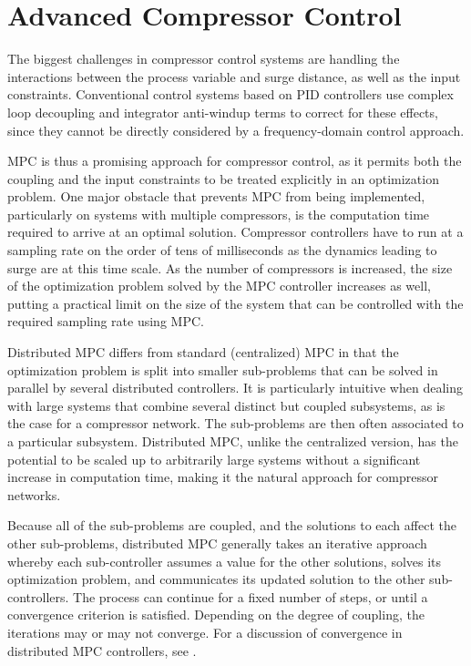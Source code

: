 \section{Advanced Compressor Control}
\label{sec:intro:mpc}

The biggest challenges in compressor control systems are handling the interactions between the process variable and surge distance, as well as the input constraints.
Conventional control systems based on PID controllers use complex loop decoupling and integrator anti-windup terms to correct for these effects, since they cannot be directly considered by a frequency-domain control approach.

MPC is thus a promising approach for compressor control, as it permits both the coupling and the input constraints to be treated explicitly in an optimization problem. 
One major obstacle that prevents MPC from being implemented, particularly on systems with multiple compressors, is the computation time required to arrive at an optimal solution.
Compressor controllers have to run at a sampling rate on the order of tens of milliseconds as the dynamics leading to surge are at this time scale.
As the number of compressors is increased, the size of the optimization problem solved by the MPC controller increases as well, putting a practical limit on the size of the system that can be controlled with the required sampling rate using MPC. 

Distributed MPC differs from standard (centralized) MPC in that the optimization problem is split into smaller sub-problems that can be solved in parallel by several distributed controllers.
It is particularly intuitive when dealing with large systems that combine several distinct but coupled subsystems, as is the case for a compressor network.
The sub-problems are then often associated to a particular subsystem.
Distributed MPC, unlike the centralized version, has the potential to be scaled up to arbitrarily large systems without a significant increase in computation time, making it the natural approach for compressor networks. 

Because all of the sub-problems are coupled, and the solutions to each affect the other sub-problems, distributed MPC generally takes an iterative approach whereby each sub-controller assumes a value for the other solutions, solves its optimization problem, and communicates its updated solution to the other sub-controllers.
The process can continue for a fixed number of steps, or until a convergence criterion is satisfied.
Depending on the degree of coupling, the iterations may or may not converge. For a discussion of convergence in distributed MPC controllers, see \cite{Stewart2010}.

